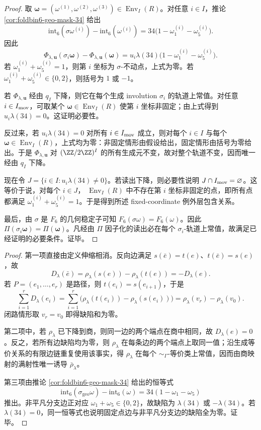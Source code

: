 \begin{proof}
取
\(\boldsymbol\omega=(\omega^{(1)},\omega^{(2)},\omega^{(3)})\in\operatorname{Env}_I(R)\)。对任意
\(i\in I\)，推论 \ref{cor:foldbin6-geo-mask-34} 给出
\[
\mathrm{int}_6(\sigma\omega^{(i)})-\mathrm{int}_6(\omega^{(i)})
=34\bigl(1-\omega^{(i)}_1-\omega^{(i)}_5\bigr).
\]
因此
\[
\Phi_{\lambda,\mathbf u}(\sigma_i\boldsymbol\omega)-
\Phi_{\lambda,\mathbf u}(\boldsymbol\omega)
=u_i\lambda(34)\bigl(1-\omega^{(i)}_1-\omega^{(i)}_5\bigr).
\]
若 \(\omega^{(i)}_1+\omega^{(i)}_5=1\)，则第 \(i\) 坐标为 \(\sigma\)-不动点，上式为零。若
\(\omega^{(i)}_1+\omega^{(i)}_5\in\{0,2\}\)，则括号为 \(1\) 或 \(-1\)。

若 \(\Phi_{\lambda,\mathbf u}\) 经由 \(q_I\) 下降，则它在每个生成 involution
\(\sigma_i\) 的轨道上常值。对任意 \(i\in I_{\rm mov}\)，可取某个
\(\boldsymbol\omega\in\operatorname{Env}_I(R)\) 使第 \(i\) 坐标非固定；由上式得到
\(u_i\lambda(34)=0\)。这证明必要性。

反过来，若 \(u_i\lambda(34)=0\) 对所有 \(i\in I_{\rm mov}\) 成立，则对每个
\(i\in I\) 与每个 \(\boldsymbol\omega\in\operatorname{Env}_I(R)\)，上式均为零：非固定情形由假设给出，固定情形由括号为零给出。于是
\(\Phi_{\lambda,\mathbf u}\) 对 \((\ZZ/2\ZZ)^I\) 的所有生成元不变，故对整个轨道不变，因而唯一经由
\(q_I\) 下降。

现在令 \(J=\{i\in I:u_i\lambda(34)\ne0\}\)。若读出下降，则必要性说明
\(J\cap I_{\rm mov}=\varnothing\)。这等价于说，对每个 \(i\in J\)，
\(\operatorname{Env}_I(R)\) 中不存在第 \(i\) 坐标非固定的点，即所有点都满足
\(\omega^{(i)}_1+\omega^{(i)}_5=1\)。于是得到所述 fixed-coordinate 例外层包含关系。

最后，由 \(\sigma\) 是 \(F_6\) 的几何稳定子可知
\(F_6(\sigma\omega)=F_6(\omega)\)。因此 \(\Pi(\sigma_i\boldsymbol\omega)=\Pi(\boldsymbol\omega)\)。凡经由 \(\Pi\) 因子化的读出必在每个 \(\sigma_i\)-轨道上常值，故满足已经证明的必要条件。证毕。
\end{proof}

\begin{proof}
第一项直接由定义伸缩相消。反向边满足 \(s(\bar e)=t(e)\)、\(t(\bar e)=s(e)\)，故
\[
D_\lambda(\bar e)=\rho_\lambda(s(e))-\rho_\lambda(t(e))=-D_\lambda(e).
\]
若 \(P=(e_1,\ldots,e_r)\) 是路径，则 \(t(e_i)=s(e_{i+1})\)，于是
\[
\sum_{i=1}^rD_\lambda(e_i)
=\sum_{i=1}^r\bigl(\rho_\lambda(t(e_i))-\rho_\lambda(s(e_i))\bigr)
=\rho_\lambda(v_r)-\rho_\lambda(v_0).
\]
闭路情形取 \(v_r=v_0\) 即得缺陷和为零。

第二项中，若 \(\rho_\lambda\) 已下降到商，则同一边的两个端点在商中相同，故
\(D_\lambda(e)=0\)。反之，若所有边缺陷均为零，则 \(\rho_\lambda\) 在每条边的两个端点上取同一值；沿生成等价关系的有限边链重复使用该事实，得 \(\rho_\lambda\) 在每个 \(\sim_\Gamma\)-等价类上常值，因而由商映射的满射性唯一诱导 \(\bar\rho_\lambda\)。

第三项由推论 \ref{cor:foldbin6-geo-mask-34} 给出的恒等式
\[
\mathrm{int}_6(\sigma_{\mathrm{geo}}\omega)-\mathrm{int}_6(\omega)
=34(1-\omega_1-\omega_5)
\]
推出。非平凡分支边正对应 \(\omega_1+\omega_5\in\{0,2\}\)，故缺陷为 \(\lambda(34)\) 或 \(-\lambda(34)\)。若 \(\lambda(34)=0\)，同一恒等式也说明固定点边与非平凡分支边的缺陷全为零。证毕。
\end{proof}

